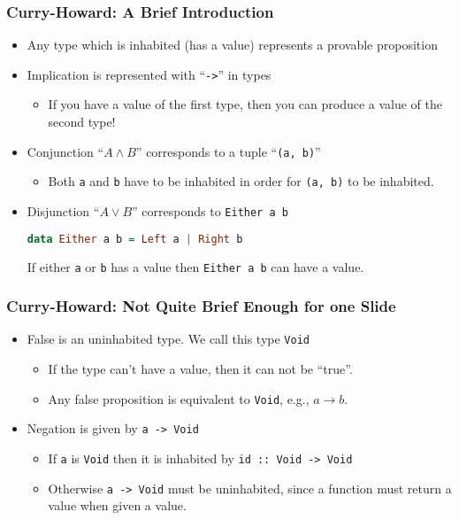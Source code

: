 \documentclass{beamer}
\begin{document}
\begin{frame}[fragile]
  \frametitle{Curry-Howard: A Brief Introduction}

  \begin{itemize}
  \item<1-> Any type which is inhabited (has a value) represents a provable proposition
  \item<2-> Implication is represented with ``\texttt{->}'' in types

    \begin{itemize}
    \item If you have a value of the first type, then you can produce a value of the second type!
    \end{itemize}

  \item<3-> Conjunction ``$A \wedge B$'' corresponds to a tuple ``\texttt{(a, b)}''

    \begin{itemize}
    \item Both \texttt{a} and \texttt{b} have to be inhabited in order for \texttt{(a, b)} to be inhabited.
    \end{itemize}

  \item<4-> Disjunction ``$A \vee B$'' corresponds to \texttt{Either a b}

\begin{lstlisting}[frame=single, language=Haskell, breaklines=true]
data Either a b = Left a | Right b
\end{lstlisting}

    If either \texttt{a} or \texttt{b} has a value then \texttt{Either a b} can have a value.
  \end{itemize}
\end{frame}

\begin{frame}[fragile]
  \frametitle{Curry-Howard: Not Quite Brief Enough for one Slide}

  \begin{itemize}
  \item<1-> False is an uninhabited type. We call this type \texttt{Void}
    \begin{itemize}
    \item If the type can't have a value, then it can not be ``true''.
    \item Any false proposition is equivalent to \texttt{Void}, e.g., $a \rightarrow b$.
    \end{itemize}
  \item<2-> Negation is given by \texttt{a -> Void}

    \begin{itemize}
    \item If \texttt{a} is \texttt{Void} then it is inhabited by \texttt{id :: Void -> Void}
    \item Otherwise \texttt{a -> Void} must be uninhabited, since a function must return a value when given a value.
    \end{itemize}
  \end{itemize}
\end{frame}
\end{document}
